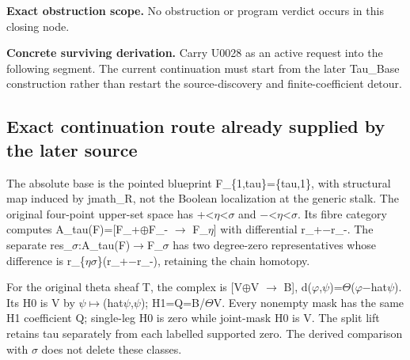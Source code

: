 \documentclass[10pt,a4paper,oneside]{report}
\begin{document}
\textbf{Exact obstruction scope.} No obstruction or program verdict
occurs in this closing node.

\textbf{Concrete surviving derivation.} Carry U0028 as an active request
into the following segment. The current continuation must start from the
later Tau\_Base construction rather than restart the source-discovery
and finite-coefficient detour.

\subsection{Exact continuation route already supplied by the later
source}\label{exact-continuation-route-already-supplied-by-the-later-source}

The absolute base is the pointed blueprint F\_\{1,tau\}=\{tau,1\}, with
structural map induced by jmath\_R, not the Boolean localization at the
generic stalk. The original four-point upper-set space has
+<\allowbreak{}\ensuremath{η}\allowbreak{}<\allowbreak{}\ensuremath{σ}\allowbreak{}
and
\allowbreak{}\ensuremath{−}\allowbreak{}<\allowbreak{}\ensuremath{η}\allowbreak{}<\allowbreak{}\ensuremath{σ}\allowbreak{}.
Its fibre category computes
A\_tau(F)=[F\_+\allowbreak{}\ensuremath{⊕}\allowbreak{}F\_-
\allowbreak{}\ensuremath{→}\allowbreak{}
F\_\allowbreak{}\ensuremath{η}\allowbreak{}] with differential
r\_+\allowbreak{}\ensuremath{−}\allowbreak{}r\_-. The separate
res\_\allowbreak{}\ensuremath{σ}\allowbreak{}:A\_tau(F)\allowbreak{}\ensuremath{→}\allowbreak{}F\_\allowbreak{}\ensuremath{σ}\allowbreak{}
has two degree-zero representatives whose difference is
r\_\{\allowbreak{}\ensuremath{η}\allowbreak{}\allowbreak{}\ensuremath{σ}\allowbreak{}\}(r\_+\allowbreak{}\ensuremath{−}\allowbreak{}r\_-),
retaining the chain homotopy.

For the original theta sheaf T, the complex is
[V\allowbreak{}\ensuremath{⊕}\allowbreak{}V
\allowbreak{}\ensuremath{→}\allowbreak{} B{]},
d(\allowbreak{}\ensuremath{φ}\allowbreak{},\allowbreak{}\ensuremath{ψ}\allowbreak{})=\allowbreak{}\ensuremath{Θ}\allowbreak{}(\allowbreak{}\ensuremath{φ}\allowbreak{}\allowbreak{}\ensuremath{−}\allowbreak{}hat\allowbreak{}\ensuremath{ψ}\allowbreak{}).
Its H0 is V by
\allowbreak{}\ensuremath{ψ}\allowbreak{}\allowbreak{}\ensuremath{↦}\allowbreak{}(hat\allowbreak{}\ensuremath{ψ}\allowbreak{},\allowbreak{}\ensuremath{ψ}\allowbreak{});
H1=Q=B/\allowbreak{}\ensuremath{Θ}\allowbreak{}V. Every nonempty mask
has the same H1 coefficient Q; single-leg H0 is zero while joint-mask H0
is V. The split lift retains tau separately from each labelled supported
zero. The derived comparison with
\allowbreak{}\ensuremath{σ}\allowbreak{} does not delete these classes.
\end{document}
